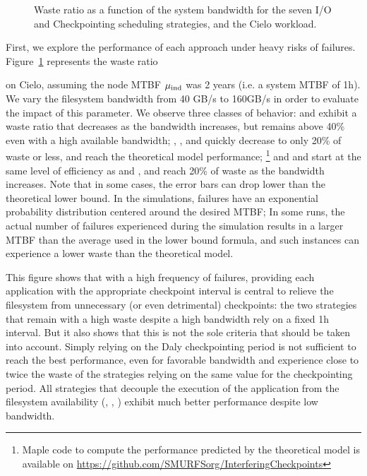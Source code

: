 \begin{figure}
  \begin{center}
    \resizebox{\linewidth}{!}{}
  \end{center}
  \caption{Waste ratio as a function of the system bandwidth for the
    seven I/O and Checkpointing scheduling strategies, and the Cielo
    workload. \label{fig:cielo-1hmtbf}}
\end{figure}

First, we explore the performance of each approach under heavy risks
of failures. Figure~\ref{fig:cielo-1hmtbf} represents the waste ratio

on Cielo, assuming the node MTBF $\mu_{\text{ind}}$ was 2 years (i.e. a system
MTBF of 1h). We vary the filesystem bandwidth from 40 GB/s to 160GB/s
in order to evaluate the impact of this parameter. We observe three
classes of behavior: \propfixed and \bfifofixed exhibit a waste ratio
that decreases as the bandwidth increases, but remains above 40\% even
with a high available bandwidth; \fifodaly, \fifofixed, and
\cooperative quickly decrease to only 20\% of waste or less, and reach
the theoretical model performance;
%
\footnote{Maple code to compute the
  performance predicted by the theoretical model is available on
  \url{https://github.com/SMURFSorg/InterferingCheckpoints}}
%
and \propdaly and \bfifodaly start at the same level of efficiency as
\propfixed and \bfifofixed, and reach 20\% of waste as the bandwidth
increases.
%
Note that in some cases, the error bars can drop lower than the theoretical
lower bound. In the simulations, failures have an exponential probability
distribution centered around the desired MTBF; In some runs, the actual
number of failures experienced during the simulation results in a larger
MTBF than the average used in the lower bound formula, and such instances
can experience a lower waste than the theoretical model.

This figure shows that with a high frequency of failures, providing
each application with the appropriate checkpoint interval is central
to relieve the filesystem from unnecessary (or even detrimental)
checkpoints: the two strategies that remain with a high waste despite
a high bandwidth rely on a fixed 1h interval.
But it also shows that this is not the sole criteria that should be taken
into account. Simply relying on the Daly checkpointing period is not
sufficient to reach the best performance, even for favorable bandwidth
\propdaly and \bfifodaly experience close to
twice the waste of the strategies relying on the same value for
the checkpointing period. All strategies that decouple the execution
of the application from the filesystem availability (\fifodaly,
\fifofixed, \cooperative) exhibit much better performance despite low
bandwidth.

